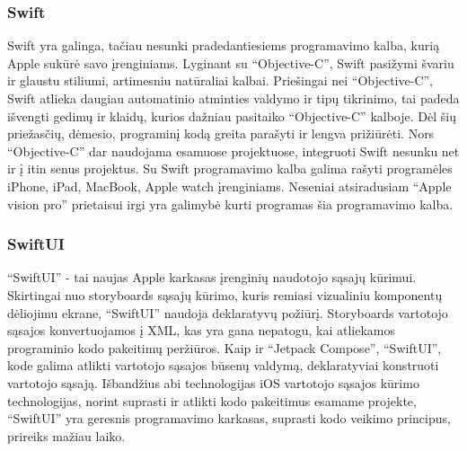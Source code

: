 \subsubsection{Swift}
Swift yra galinga, tačiau nesunki pradedantiesiems programavimo kalba, kurią Apple sukūrė savo įrenginiams. Lyginant su \enquote{Objective-C}, Swift pasižymi švariu ir glaustu stiliumi, artimesniu natūraliai kalbai. Priešingai nei \enquote{Objective-C}, Swift atlieka daugiau automatinio atminties valdymo ir tipų tikrinimo, tai padeda išvengti gedimų ir klaidų, kurios dažniau pasitaiko \enquote{Objective-C} kalboje. Dėl šių priežasčių, dėmesio, programinį kodą  greita parašyti ir lengva prižiūrėti. Nors \enquote{Objective-C} dar naudojama esamuose projektuose, integruoti Swift nesunku net ir į itin senus projektus. Su Swift programavimo kalba galima rašyti programėles iPhone, iPad, MacBook, Apple watch įrenginiams. Neseniai atsiradusiam \enquote{Apple vision pro} prietaisui irgi yra galimybė kurti programas šia programavimo kalba. 

\subsubsection{SwiftUI}

\enquote{SwiftUI} - tai naujas Apple karkasas įrenginių naudotojo sąsajų kūrimui. Skirtingai nuo storyboards sąsajų kūrimo, kuris remiasi vizualiniu komponentų dėliojimu ekrane, \enquote{SwiftUI} naudoja deklaratyvų požiūrį. Storyboards vartotojo sąsajos konvertuojamos į XML,  kas yra gana nepatogu, kai atliekamos programinio kodo pakeitimų peržiūros. Kaip ir \enquote{Jetpack Compose}, \enquote{SwiftUI}, kode galima atlikti vartotojo sąsajos būsenų valdymą, deklaratyviai konstruoti vartotojo sąsają. Išbandžius abi technologijas iOS vartotojo sąsajos kūrimo technologijas, norint suprasti ir atlikti kodo pakeitimus esamame projekte, \enquote{SwiftUI} yra geresnis programavimo karkasas, suprasti kodo veikimo principus, prireiks mažiau laiko.